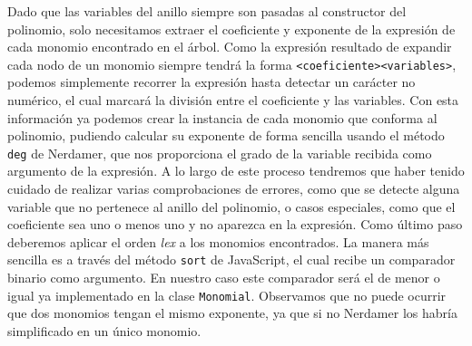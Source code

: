 Dado que las variables del anillo siempre son pasadas al constructor del polinomio, solo necesitamos extraer el coeficiente y exponente de la expresión de cada monomio encontrado en el árbol. Como la expresión resultado de expandir cada nodo de un monomio siempre tendrá la forma \texttt{<coeficiente><variables>}, podemos simplemente recorrer la expresión hasta detectar un carácter no numérico, el cual marcará la división entre el coeficiente y las variables. Con esta información ya podemos crear la instancia de cada monomio que conforma al polinomio, pudiendo calcular su exponente de forma sencilla usando el método \texttt{deg} de Nerdamer, que nos proporciona el grado de la variable recibida como argumento de la expresión. A lo largo de este proceso tendremos que haber tenido cuidado de realizar varias comprobaciones de errores, como que se detecte alguna variable que no pertenece al anillo del polinomio, o casos especiales, como que el coeficiente sea uno o menos uno y no aparezca en la expresión. Como último paso deberemos aplicar el orden \textit{lex} a los monomios encontrados. La manera más sencilla es a través del método \texttt{sort} de JavaScript, el cual recibe un comparador binario como argumento. En nuestro caso este comparador será el de menor o igual ya implementado en la clase \texttt{Monomial}. Observamos que no puede ocurrir que dos monomios tengan el mismo exponente, ya que si no Nerdamer los habría simplificado en un único monomio.\newline

